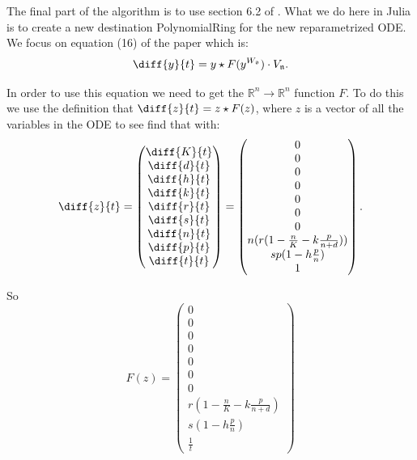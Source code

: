 \documentclass[oneside, a4paper, onecolumn, 11pt]{article}
\begin{document}
The final part of the algorithm is to use section 6.2 of \cite{Hubert2013}. What we do here in Julia is to create a new destination PolynomialRing for the new reparametrized ODE. We focus on equation (16) of the paper which is:
\[
    \diff{y}{t} = y \star F(y^{W_{\mathfrak{d}}}) \cdot V_{\mathfrak{n}}.
\]

In order to use this equation we need to get the \(\mathbb{R}^n \to \mathbb{R}^n\) function \(F\). To do this we use the definition that \(\diff{z}{t} = z \star F(z)\), where \(z\) is a vector of all the variables in the ODE to see find that with:
\[
    \diff{z}{t} =
    \begin{pmatrix}
        \diff{K}{t} \\
        \diff{d}{t} \\
        \diff{h}{t} \\
        \diff{k}{t} \\
        \diff{r}{t} \\
        \diff{s}{t} \\
        \diff{n}{t} \\
        \diff{p}{t} \\
        \diff{t}{t}
    \end{pmatrix} =
    \begin{pmatrix}
        0                                           \\
        0                                           \\
        0                                           \\
        0                                           \\
        0                                           \\
        0                                           \\
        0                                           \\
        n (r (1 - \frac{n}{K} - k \frac{p}{n + d})) \\
        sp (1 - h \frac{p}{n})                      \\
        1
    \end{pmatrix}.
\]

So
\[
    F(z) =
    \begin{pmatrix}
        0                                       \\
        0                                       \\
        0                                       \\
        0                                       \\
        0                                       \\
        0                                       \\
        0                                       \\
        r (1 - \frac{n}{K} - k \frac{p}{n + d}) \\
        s(1 - h \frac{p}{n})                    \\
        \frac{1}{t}
    \end{pmatrix}
\]
\end{document}
